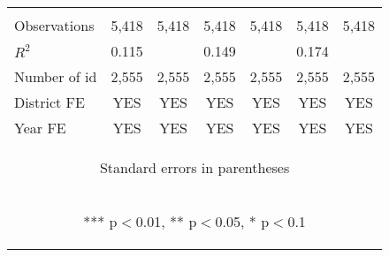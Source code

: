 \begin{center}
\begin{tabular}{lcccccc}
\vspace{4pt} & \begin{footnotesize}\end{footnotesize} & \begin{footnotesize}\end{footnotesize} & \begin{footnotesize}\end{footnotesize} & \begin{footnotesize}\end{footnotesize} & \begin{footnotesize}\end{footnotesize} & \begin{footnotesize}\end{footnotesize} \\
Observations & 5,418 & 5,418 & 5,418 & 5,418 & 5,418 & 5,418 \\
$R^2$ & 0.115 &  & 0.149 &  & 0.174 &  \\
Number of id & 2,555 & 2,555 & 2,555 & 2,555 & 2,555 & 2,555 \\
District FE & YES & YES & YES & YES & YES & YES \\
 Year FE & YES & YES & YES & YES & YES & YES \\ \hline
\multicolumn{7}{c}{\begin{footnotesize} Standard errors in parentheses\end{footnotesize}} \\
\multicolumn{7}{c}{\begin{footnotesize} *** p$<$0.01, ** p$<$0.05, * p$<$0.1\end{footnotesize}} \\
\end{tabular}
\end{center}
